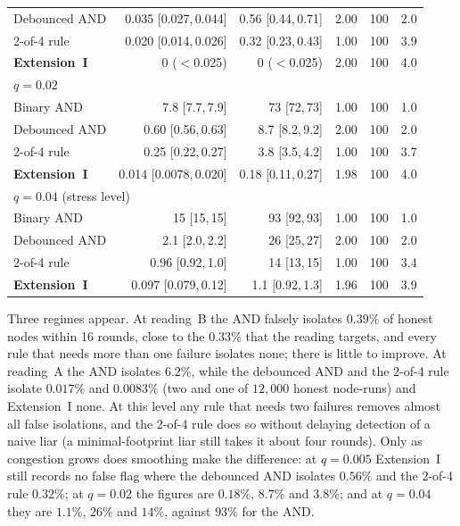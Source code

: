 \documentclass{ieeeaccess}
\begin{document}
\begin{table}[!t]
\begin{tabular}{lrrrrr}
Debounced AND & 0.035 [0.027,\,0.044] & 0.56 [0.44,\,0.71] & 2.00 & 100 & 2.0 \\
2-of-4 rule & 0.020 [0.014,\,0.026] & 0.32 [0.23,\,0.43] & 1.00 & 100 & 3.9 \\
\textbf{Extension~I} & 0 ($<$0.025) & 0 ($<$0.025) & 2.00 & 100 & 4.0 \\
\midrule
\multicolumn{6}{l}{$q=0.02$} \\
Binary AND~\cite{soula2024iodt} & 7.8 [7.7,\,7.9] & 73 [72,\,73] & 1.00 & 100 & 1.0 \\
Debounced AND & 0.60 [0.56,\,0.63] & 8.7 [8.2,\,9.2] & 2.00 & 100 & 2.0 \\
2-of-4 rule & 0.25 [0.22,\,0.27] & 3.8 [3.5,\,4.2] & 1.00 & 100 & 3.7 \\
\textbf{Extension~I} & 0.014 [0.0078,\,0.020] & 0.18 [0.11,\,0.27] & 1.98 & 100 & 4.0 \\
\midrule
\multicolumn{6}{l}{$q=0.04$ (stress level)} \\
Binary AND~\cite{soula2024iodt} & 15 [15,\,15] & 93 [92,\,93] & 1.00 & 100 & 1.0 \\
Debounced AND & 2.1 [2.0,\,2.2] & 26 [25,\,27] & 2.00 & 100 & 2.0 \\
2-of-4 rule & 0.96 [0.92,\,1.0] & 14 [13,\,15] & 1.00 & 100 & 3.4 \\
\textbf{Extension~I} & 0.097 [0.079,\,0.12] & 1.1 [0.92,\,1.3] & 1.96 & 100 & 3.9 \\
\bottomrule
\end{tabular}
\end{table}

Three regimes appear.  At reading~B the AND falsely isolates $0.39\%$
of honest nodes within 16 rounds, close to the $0.33\%$ that the
reading targets, and every rule that needs more than one failure
isolates none; there is little to improve.  At reading~A the AND
isolates $6.2\%$, while the debounced AND and the 2-of-4 rule isolate
$0.017\%$ and $0.0083\%$ (two and one of $12{,}000$ honest node-runs)
and Extension~I none.  At this level any rule that needs two failures
removes almost all false isolations, and the 2-of-4 rule does so
without delaying detection of a naive liar (a minimal-footprint liar
still takes it about four rounds).  Only as congestion grows does smoothing
make the difference: at $q=0.005$ Extension~I still records no false
flag where the debounced AND isolates $0.56\%$ and the 2-of-4 rule
$0.32\%$; at $q=0.02$ the figures are $0.18\%$, $8.7\%$ and $3.8\%$;
and at $q=0.04$ they are $1.1\%$, $26\%$ and $14\%$, against $93\%$
for the AND.
\end{document}
